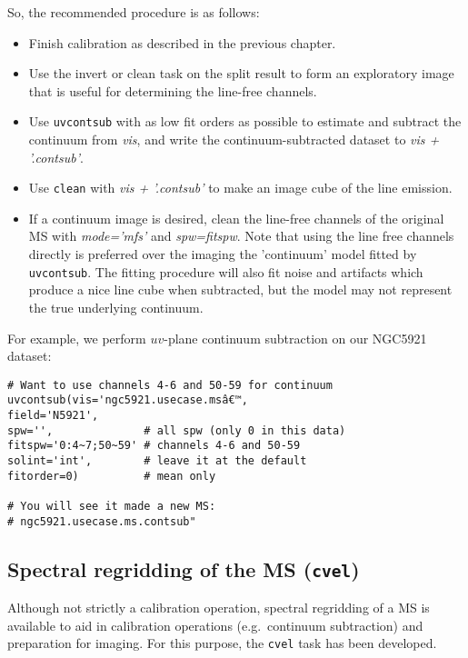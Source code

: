 {So, the recommended procedure is as follows:
\begin{itemize}
\item Finish calibration as described in the previous chapter.
\item Use the invert or clean task on the split result to form an exploratory
  image that is useful for determining the line-free channels.
\item Use {\tt uvcontsub} with as low fit orders as possible to estimate and subtract the
  continuum from {\it vis}, and write the continuum-subtracted dataset
  to {\it vis + '.contsub'}.
\item Use {\tt clean} with {\it vis + '.contsub'} to make an image cube of the line emission.
\item If a continuum image is desired, clean the line-free channels of the
  original MS with {\it mode='mfs'} and {\it spw=fitspw}. Note that
  using the line free channels directly is preferred over the imaging
  the 'continuum' model fitted by {\tt uvcontsub}. The fitting
  procedure will also fit noise and artifacts which produce a nice
  line cube when subtracted, but the model may not represent the true
  underlying continuum.   
\end{itemize}

For example, we perform $uv$-plane continuum subtraction on our NGC5921
dataset:
\small
\begin{verbatim}
# Want to use channels 4-6 and 50-59 for continuum
uvcontsub(vis='ngc5921.usecase.msâ€™,
field='N5921',
spw='',              # all spw (only 0 in this data)
fitspw='0:4~7;50~59' # channels 4-6 and 50-59
solint='int',        # leave it at the default
fitorder=0)          # mean only

# You will see it made a new MS:
# ngc5921.usecase.ms.contsub"
\end{verbatim}
\normalsize

\subsection{Spectral regridding of the MS ({\tt cvel})}
\label{section:cal.other.cvel}

Although not strictly a calibration operation, spectral regridding
of a MS is available to aid in calibration operations (e.g.\ continuum
subtraction) and preparation for imaging.  For this purpose, the
{\tt cvel} task has been developed.  

}
